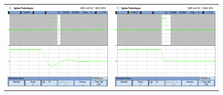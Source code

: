 \begin{figure}[H]
	\centering
	\begin{tabular}{c c}
		\includegraphics[scale=0.2]{../EJ4/Derivador/Mediciones/Osciloscopio/PCB_Compensado/Calibracion/scope_19.png} &
		\includegraphics[scale=0.2]{../EJ4/Derivador/Mediciones/Osciloscopio/PCB_Compensado/Calibracion/scope_21.png}
	\end{tabular}

\end{figure}
